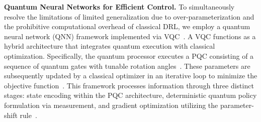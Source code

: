 \documentclass[pdflatex,sn-mathphys-num]{sn-jnl}%
\newcommand{\BfPara}[1]{{\noindent\bf#1.}\xspace}
\theoremstyle{thmstyleone}%
\theoremstyle{thmstyletwo}%
\theoremstyle{thmstylethree}%
\begin{document}
\BfPara{Quantum Neural Networks for Efficient Control}
To simultaneously resolve the limitations of limited generalization due to over-parameterization and the prohibitive computational overhead of classical DRL, we employ a quantum neural network (QNN) framework implemented via VQC~\citep{ben_19_par}. A VQC functions as a hybrid architecture that integrates quantum execution with classical optimization. Specifically, the quantum processor executes a PQC consisting of a sequence of quantum gates with tunable rotation angles~\citep{jer_21_par}. These parameters are subsequently updated by a classical optimizer in an iterative loop to minimize the objective function~\citep{mcc_16_the}. This framework processes information through three distinct stages: state encoding within the PQC architecture, deterministic quantum policy formulation via measurement, and gradient optimization utilizing the parameter-shift rule~\citep{sch_19_qua}.
\end{document}
